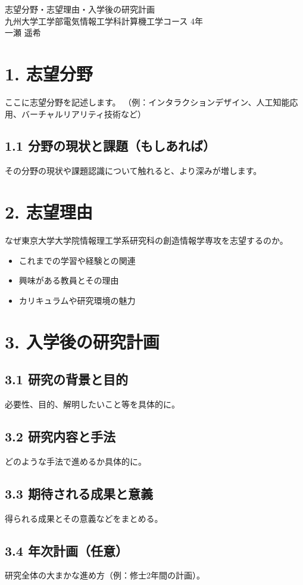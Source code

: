 \documentclass[main.tex]{subfiles}
\begin{document}
\begin{center}
    {\Large 志望分野・志望理由・入学後の研究計画}\\[1em]
    九州大学工学部電気情報工学科計算機工学コース 4年\\
    一瀬 遥希
\end{center}
\vspace{1.5em}

\section*{1. 志望分野}
ここに志望分野を記述します。
（例：インタラクションデザイン、人工知能応用、バーチャルリアリティ技術など）

\subsection*{1.1 分野の現状と課題（もしあれば）}
その分野の現状や課題認識について触れると、より深みが増します。

\section*{2. 志望理由}
なぜ東京大学大学院情報理工学系研究科の創造情報学専攻を志望するのか。
\begin{itemize}
    \item これまでの学習や経験との関連
    \item 興味がある教員とその理由
    \item カリキュラムや研究環境の魅力
\end{itemize}

\section*{3. 入学後の研究計画}
\subsection*{3.1 研究の背景と目的}
必要性、目的、解明したいこと等を具体的に。

\subsection*{3.2 研究内容と手法}
どのような手法で進めるか具体的に。

\subsection*{3.3 期待される成果と意義}
得られる成果とその意義などをまとめる。

\subsection*{3.4 年次計画（任意）}
研究全体の大まかな進め方（例：修士2年間の計画）。
\end{document}
